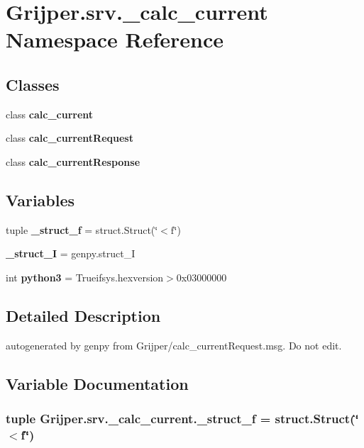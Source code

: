 \section{Grijper.\-srv.\-\_\-calc\-\_\-current Namespace Reference}
\label{namespaceGrijper_1_1srv_1_1__calc__current}
\subsection*{Classes}
\begin{DoxyCompactItemize}
\item 
class {\bf calc\-\_\-current}
\item 
class {\bf calc\-\_\-current\-Request}
\item 
class {\bf calc\-\_\-current\-Response}
\end{DoxyCompactItemize}
\subsection*{Variables}
\begin{DoxyCompactItemize}
\item 
tuple {\bf \-\_\-struct\-\_\-f} = struct.\-Struct(\char`\"{}$<$f\char`\"{})
\item 
{\bf \-\_\-struct\-\_\-\-I} = genpy.\-struct\-\_\-\-I
\item 
int {\bf python3} = Trueifsys.\-hexversion$>$0x03000000
\end{DoxyCompactItemize}


\subsection{Detailed Description}
\begin{DoxyVerb}autogenerated by genpy from Grijper/calc_currentRequest.msg. Do not edit.\end{DoxyVerb}
 

\subsection{Variable Documentation}
\subsubsection[{\-\_\-struct\-\_\-f}]{\setlength{\rightskip}{0pt plus 5cm}tuple Grijper.\-srv.\-\_\-calc\-\_\-current.\-\_\-struct\-\_\-f = struct.\-Struct(\char`\"{}$<$f\char`\"{})}\label{namespaceGrijper_1_1srv_1_1__calc__current_adde5a211b18fa06f08aea2febee2257e}


